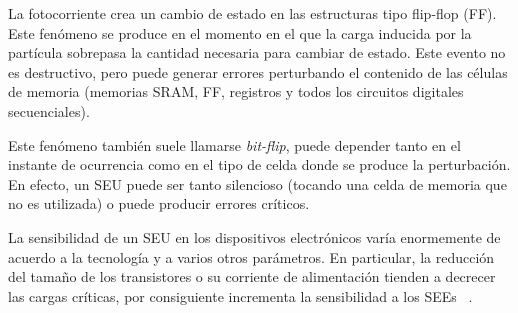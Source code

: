La fotocorriente crea un cambio de estado en las estructuras tipo flip-flop (FF). Este fenómeno se produce en el momento en el que la carga inducida por la partícula sobrepasa la cantidad necesaria para cambiar de estado. Este evento no es destructivo, pero puede generar errores perturbando el contenido de las células de memoria (memorias SRAM, FF, registros y todos los circuitos digitales secuenciales).

Este fenómeno también suele llamarse \textit{bit-flip}, puede depender tanto en el instante de ocurrencia como en el tipo de celda donde se produce la perturbación. En efecto, un SEU puede ser tanto silencioso (tocando una celda de memoria que no es utilizada) o puede producir errores críticos.

La sensibilidad de un SEU en los dispositivos electrónicos varía enormemente de acuerdo a la tecnología y a varios otros parámetros. En particular, la reducción del tamaño de los transistores o su corriente de alimentación tienden a decrecer las cargas críticas, por consiguiente incrementa la sensibilidad a los SEEs ~\cite{ grandstrand:2004}.